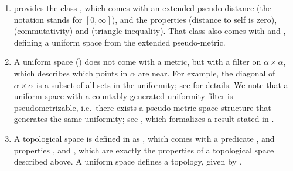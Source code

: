 \documentclass[lean]{DraftAFM}
\begin{document}
\begin{remark} \label{rem:uniform}\mbox{}
  \begin{enumerate}
    \item \sloppy {} provides the class ,
      which comes with an extended pseudo-distance
       (the notation 
      stands for $[0, \infty]$), and the properties
       (distance to self is zero),
       (commutativity) and
       (triangle inequality).
      That class also comes with  and
      , defining a uniform space from the
      extended pseudo-metric.
    \item A uniform space () does not come with a
      metric, but with a filter on $\alpha \times \alpha$, which
      describes which points in $\alpha$ are near. For example, the
      diagonal of $\alpha \times \alpha$ is a subset of all sets in
      the uniformity; see \cite{james2013topologies} for details. We
      note that a uniform space with a countably generated uniformity
      filter is pseudometrizable, i.e.\ there exists a
      pseudo-metric-space structure that generates the same
      uniformity; see ,
      which formalizes a result stated in
      \cite{melikhov2011metrizable}.
    \item \sloppy A topological space is defined in  as ,
      which comes with a predicate , and properties ,  and
      , which are exactly the properties of a
      topological space described above.
      A uniform space defines a topology, given by
      .
  \end{enumerate}
\end{remark}
\end{document}
